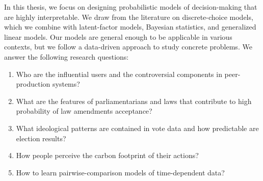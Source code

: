 In this thesis, we focus on designing probabilistic models of decision-making that are highly interpretable.
We draw from the literature on discrete-choice models, which we combine with latent-factor models, Bayesian statistics, and generalized linear models.
Our models are general enough to be applicable in various contexts, but we follow a data-driven approach to study concrete problems.
We answer the following research questions:
\begin{enumerate}[
		label=\textbf{RQ\arabic*}
	]
	\item Who are the influential users and the controversial components in peer-production systems?
	\item What are the features of parliamentarians and laws that contribute to high probability of law amendments acceptance?
	\item What ideological patterns are contained in vote data and how predictable are election results?
	\item How people perceive the carbon footprint of their actions?
	\item How to learn pairwise-comparison models of time-dependent data?
\end{enumerate}
